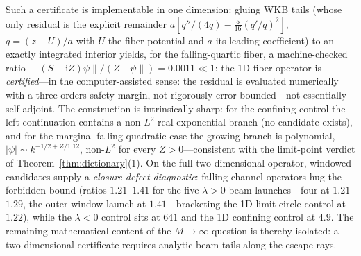 \documentclass[11pt]{article}
\theoremstyle{definition}
\theoremstyle{remark}
\newcommand{\ii}{\mathrm{i}}
\newcommand{\norm}[1]{\left\lVert #1 \right\rVert}
\begin{document}
Such a certificate is implementable in one dimension: gluing WKB tails
(whose only residual is the explicit remainder
$a[q''/(4q)-\tfrac{5}{16}(q'/q)^{2}]$, $q=(z-U)/a$ with $U$ the fiber
potential and $a$ its leading coefficient) to an exactly
integrated interior yields, for the falling-quartic fiber, a
machine-checked ratio $\norm{(S-\ii Z)\psi}/(Z\norm{\psi})=0.0011\ll1$:
the 1D fiber operator is \emph{certified}---in the computer-assisted
sense: the residual is evaluated numerically with a three-orders
safety margin, not rigorously error-bounded---not essentially
self-adjoint.
The construction is intrinsically sharp: for the confining control the
left continuation contains a non-$L^{2}$ real-exponential branch (no
candidate exists), and for the marginal falling-quadratic case the
growing branch is polynomial, $|\psi|\sim k^{-1/2+Z/1.12}$,
non-$L^{2}$ for every $Z>0$---consistent with the limit-point verdict
of Theorem~\ref{thm:dictionary}(1). On the full two-dimensional
operator, windowed candidates
supply a \emph{closure-defect diagnostic}: falling-channel operators hug
the forbidden bound (ratios $1.21$--$1.41$ for the five $\lambda>0$ beam
launches---four at $1.21$--$1.29$, the outer-window launch at
$1.41$---bracketing the 1D limit-circle control at $1.22$),
while the $\lambda<0$ control sits at $641$ and the 1D confining control
at $4.9$. The remaining mathematical content of the $M\to\infty$
question is thereby isolated: a two-dimensional certificate requires
analytic beam tails along the escape rays.
\end{document}
